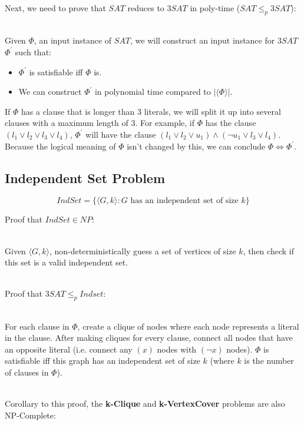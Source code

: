 \documentclass[12pt]{article}
\begin{document}
\newpage
\noindent
Next, we need to prove that $SAT$ reduces to $3SAT$ in poly-time ($SAT \leq_p 3SAT$):

\noindent
\\
Given $\Phi$, an input instance of $SAT$, we will construct an input instance for $3SAT$ $\Phi^\prime$ such that:

\begin{itemize}
    \item $\Phi^\prime$ is satisfiable iff $\Phi$ is.
    \item We can construct $\Phi^\prime$ in polynomial time compared to $|\langle \Phi \rangle|$.
\end{itemize}

\noindent
If $\Phi$ has a clause that is longer than 3 literals, we will split it up into several clauses with a maximum length of 3.
For example, if $\Phi$ has the clause $(l_1 \lor l_2 \lor l_3 \lor l_4)$, $\Phi^\prime$ will have the clause $(l_1 \lor l_2 \lor u_1) \land (\neg u_1 \lor l_3 \lor l_4)$.
Because the logical meaning of $\Phi$ isn't changed by this, we can conclude $\Phi \Leftrightarrow \Phi^\prime$.

\subsection*{Independent Set Problem}
\[ IndSet = \{\langle G, k \rangle : G \text{ has an independent set of size } k\} \]

\noindent
Proof that $IndSet \in NP$:

\noindent
\\
Given $\langle G, k \rangle$, non-deterministically guess a set of vertices of size $k$, then check if this set is a valid independent set.

\noindent
\\
Proof that $3SAT \leq_p Indset$:

\noindent
\\
For each clause in $\Phi$, create a clique of nodes where each node represents a literal in the clause.
After making cliques for every clause, connect all nodes that have an opposite literal (i.e. connect any $(x)$ nodes with $(\neg x)$ nodes).
$\Phi$ is satisfiable iff this graph has an independent set of size $k$ (where $k$ is the number of clauses in $\Phi$).

\noindent
\\
Corollary to this proof, the \textbf{k-Clique} and \textbf{k-VertexCover} problems are also NP-Complete:
\end{document}
